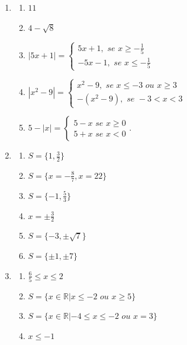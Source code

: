 \begin{enumerate}

\item
    \begin{enumerate}
        \item $11$
        \item $4-\sqrt{8}$
        \item $|5x+1|=\left\{\begin{array}{ll} 5x+1, \,\, se \,\, x \geq -\frac{1}{5}\\-5x-1, \,\, se \,\, x \leq -\frac{1}{5}\end{array}\right.$
        \item $|x^2-9|=\left\{\begin{array}{ll} x^2-9, \,\, se \,\, x \leq -3 \,\, ou \,\, x \geq 3\\-(x^2-9), \,\, se \,\, -3<x<3\end{array}\right.$
        \item $5-|x|=\left\{\begin{array}{ll} 5-x \,\, se \,\, x \geq 0\\5+x \,\, se \,\, x < 0\end{array}.\right.$
    \end{enumerate}

\item
    \begin{enumerate}
        \item $S=\{ 1, \frac{3}{2}\}$
        \item $S=\{x=-\frac{8}{7}, x=22\}$
        \item $S=\{-1,\frac{5}{3}\}$
        \item $x=\pm \frac{3}{2}$
        \item $S=\{-3, \pm\sqrt{7}\}$
        \item $S=\{\pm 1, \pm 7\}$
    \end{enumerate}

\item
    \begin{enumerate}
        \item $\frac{6}{5} \leq x \leq 2$
        \item $S= \{ x \in \mathbb{R}| x \leq -2 \,\, ou \,\, x \geq 5\}$
        \item $S= \{ x \in \mathbb{R}| -4 \leq x \leq -2 \,\, ou \,\, x=3\}$
        \item $x \leq -1$
    \end{enumerate}


\end{enumerate}
